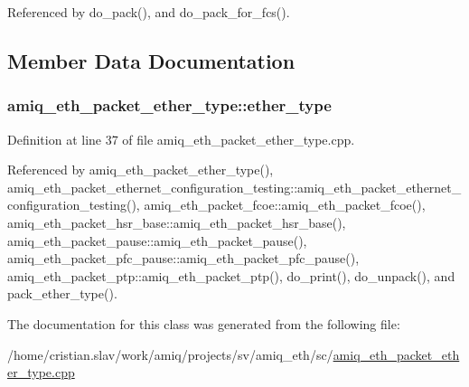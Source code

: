 Referenced by do\_\-pack(), and do\_\-pack\_\-for\_\-fcs().

\subsection{Member Data Documentation}
\hypertarget{classamiq__eth__packet__ether__type_a6d7d60a348004a078df2635936c8483a}{
\subsubsection[{ether\_\-type}]{ {\bf amiq\_\-eth\_\-packet\_\-ether\_\-type::ether\_\-type}}}
\label{classamiq__eth__packet__ether__type_a6d7d60a348004a078df2635936c8483a}


Definition at line 37 of file amiq\_\-eth\_\-packet\_\-ether\_\-type.cpp.

Referenced by amiq\_\-eth\_\-packet\_\-ether\_\-type(), amiq\_\-eth\_\-packet\_\-ethernet\_\-configuration\_\-testing::amiq\_\-eth\_\-packet\_\-ethernet\_\-configuration\_\-testing(), amiq\_\-eth\_\-packet\_\-fcoe::amiq\_\-eth\_\-packet\_\-fcoe(), amiq\_\-eth\_\-packet\_\-hsr\_\-base::amiq\_\-eth\_\-packet\_\-hsr\_\-base(), amiq\_\-eth\_\-packet\_\-pause::amiq\_\-eth\_\-packet\_\-pause(), amiq\_\-eth\_\-packet\_\-pfc\_\-pause::amiq\_\-eth\_\-packet\_\-pfc\_\-pause(), amiq\_\-eth\_\-packet\_\-ptp::amiq\_\-eth\_\-packet\_\-ptp(), do\_\-print(), do\_\-unpack(), and pack\_\-ether\_\-type().

The documentation for this class was generated from the following file:\begin{DoxyCompactItemize}
\item 
/home/cristian.slav/work/amiq/projects/sv/amiq\_\-eth/sc/\hyperlink{amiq__eth__packet__ether__type_8cpp}{amiq\_\-eth\_\-packet\_\-ether\_\-type.cpp}\end{DoxyCompactItemize}
